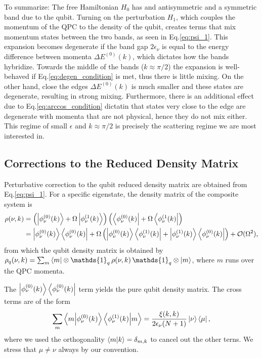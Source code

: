 \documentclass{article}
\newcommand{\Id}{\mathds{1}}
\begin{document}
To summarize: The free Hamiltonian $H_0$ has and antisymmetric and a symmetric band due to the qubit. Turning on the perturbation $H_1$, which couples the momentum of the QPC to the density of the qubit, creates terms that mix momentum states between the two bands, as seen in Eq.\eqref{eq:psi_1}. This expansion becomes degenerate if the band gap $2\epsilon_\nu$ is equal to the energy difference between momenta $\Delta E^{(0)}(k)$, which dictates how the bands hybridize. Towards the middle of the bands ($k\approx \pi/2$) the expansion is well-behaved if Eq.\eqref{eq:degen_condition} is met, thus there is little mixing. On the other hand, close the edges $\Delta E^{(0)}(k)$ is much smaller and these states are degenerate, resulting in strong mixing. Furthermore, there is an additional effect due to Eq.\eqref{eq:arccos_condition} dictatin that states very close to the edge are degenerate with momenta that are not physical, hence they do not mix either. This regime of small $\epsilon$ and $k\approx\pi/2$ is precisely the scattering regime we are most interested in.

\subsection{Corrections to the Reduced Density Matrix}

Perturbative correction to the qubit reduced density matrix are obtained from Eq.\eqref{eq:psi_1}. For a specific eigenstate, the density matrix of the composite system is 
\begin{align}
    \rho(\nu,k) & = \left( \ket{\phi_\nu^{(0)}(k)} + \Omega \ket{\phi_\nu^{(1}(k)} \right)\left( \bra{\phi_\nu^{(0)}(k)} + \Omega \bra{\phi_\nu^{(1}(k)} \right) \nonumber \\
                & = \ket{\phi_\nu^{(0)}(k)}\bra{\phi_\nu^{(0)}(k)} + \Omega \left( \ket{\phi_\nu^{(0)}(k)}\bra{\phi_\nu^{(1)}(k)} + \ket{\phi_\nu^{(1)}(k)}\bra{\phi_\nu^{(0)}(k)}   \right) + \mathcal{O}(\Omega^2),
\end{align} 
from which the qubit density matrix is obtained by $\rho_q(\nu,k) = \sum_m \bra{m}\otimes\Id_q \, \rho(\nu,k)\, \Id_q \otimes\ket{m}$, where $m$ runs over the QPC momenta. 
 
The $\ket{\phi_\nu^{(0)}(k)}\bra{\phi_\nu^{(0)}(k)}$ term yields the pure qubit density matrix. The cross terms are of the form 
\begin{align}
    \sum_{m} \bra{m} \ket{\phi_\nu^{(0)}(k)}\bra{\phi_\nu^{(1)}(k)} \ket{m} = \frac{\xi(k,k)}{2\epsilon_\nu(N+1)}\ket{\nu} \bra{\mu},
\end{align}
where we used the orthogonality $\bra{m}\ket{k}=\delta_{m,k}$ to cancel out the other terns. We stress that $\mu\neq \nu$ always by our convention. 
\end{document}
